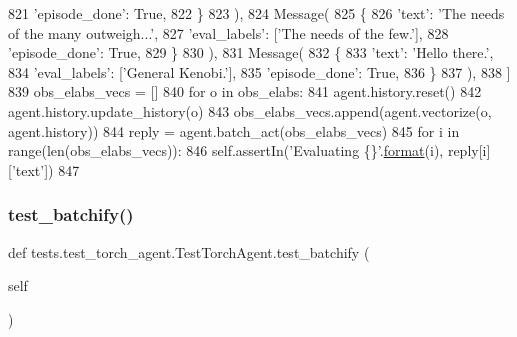 \begin{DoxyCode}
821                     \textcolor{stringliteral}{'episode\_done'}: \textcolor{keyword}{True},
822                 \}
823             ),
824             Message(
825                 \{
826                     \textcolor{stringliteral}{'text'}: \textcolor{stringliteral}{'The needs of the many outweigh...'},
827                     \textcolor{stringliteral}{'eval\_labels'}: [\textcolor{stringliteral}{'The needs of the few.'}],
828                     \textcolor{stringliteral}{'episode\_done'}: \textcolor{keyword}{True},
829                 \}
830             ),
831             Message(
832                 \{
833                     \textcolor{stringliteral}{'text'}: \textcolor{stringliteral}{'Hello there.'},
834                     \textcolor{stringliteral}{'eval\_labels'}: [\textcolor{stringliteral}{'General Kenobi.'}],
835                     \textcolor{stringliteral}{'episode\_done'}: \textcolor{keyword}{True},
836                 \}
837             ),
838         ]
839         obs\_elabs\_vecs = []
840         \textcolor{keywordflow}{for} o \textcolor{keywordflow}{in} obs\_elabs:
841             agent.history.reset()
842             agent.history.update\_history(o)
843             obs\_elabs\_vecs.append(agent.vectorize(o, agent.history))
844         reply = agent.batch\_act(obs\_elabs\_vecs)
845         \textcolor{keywordflow}{for} i \textcolor{keywordflow}{in} range(len(obs\_elabs\_vecs)):
846             self.assertIn(\textcolor{stringliteral}{'Evaluating \{\}'}.\hyperlink{namespaceparlai_1_1chat__service_1_1services_1_1messenger_1_1shared__utils_a32e2e2022b824fbaf80c747160b52a76}{format}(i), reply[i][\textcolor{stringliteral}{'text'}])
847 
\end{DoxyCode}
\mbox{\label{classtests_1_1test__torch__agent_1_1TestTorchAgent_aad1075dad0c291b524d84ec9526177dd}} 
\subsubsection{\texorpdfstring{test\+\_\+batchify()}{test\_batchify()}}
{\footnotesize\ttfamily def tests.\+test\+\_\+torch\+\_\+agent.\+Test\+Torch\+Agent.\+test\+\_\+batchify (\begin{DoxyParamCaption}\item[{}]{self }\end{DoxyParamCaption})}


